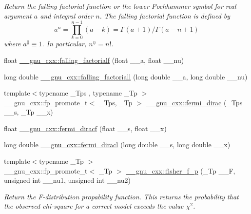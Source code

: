 \begin{DoxyCompactItemize}
\begin{DoxyCompactList}\small\item\em Return the falling factorial function or the lower Pochhammer symbol for real argument $ a $ and integral order $ n $. The falling factorial function is defined by \[ a^{\underline{n}} = \prod_{k=0}^{n-1} (a - k) = \Gamma(a + 1) / \Gamma(a - n + 1) \] where $ a^{\underline{0}} \equiv 1 $. In particular, $ n^{\underline{n}} = n! $. \end{DoxyCompactList}\item 
float \hyperlink{group__gnu__math__spec__func_gaf32abbc790bfa870725728e5470de532}{\+\_\+\+\_\+gnu\+\_\+cxx\+::falling\+\_\+factorialf} (float \+\_\+\+\_\+a, float \+\_\+\+\_\+nu)
\item 
long double \hyperlink{group__gnu__math__spec__func_gab816c3bcbe00595881799ce969475085}{\+\_\+\+\_\+gnu\+\_\+cxx\+::falling\+\_\+factoriall} (long double \+\_\+\+\_\+a, long double \+\_\+\+\_\+nu)
\item 
{\footnotesize template$<$typename \+\_\+\+Tps , typename \+\_\+\+Tp $>$ }\\\+\_\+\+\_\+gnu\+\_\+cxx\+::fp\+\_\+promote\+\_\+t$<$ \+\_\+\+Tps, \+\_\+\+Tp $>$ \hyperlink{group__gnu__math__spec__func_ga5468fbaed5cb8384cff7cfb9d2188d1a}{\+\_\+\+\_\+gnu\+\_\+cxx\+::fermi\+\_\+dirac} (\+\_\+\+Tps \+\_\+\+\_\+s, \+\_\+\+Tp \+\_\+\+\_\+x)
\item 
float \hyperlink{group__gnu__math__spec__func_gacf7f49b2b7bf50fd37d939236712cbe2}{\+\_\+\+\_\+gnu\+\_\+cxx\+::fermi\+\_\+diracf} (float \+\_\+\+\_\+s, float \+\_\+\+\_\+x)
\item 
long double \hyperlink{group__gnu__math__spec__func_ga3876af54a92853036cc88ec6b8ea5d67}{\+\_\+\+\_\+gnu\+\_\+cxx\+::fermi\+\_\+diracl} (long double \+\_\+\+\_\+s, long double \+\_\+\+\_\+x)
\item 
{\footnotesize template$<$typename \+\_\+\+Tp $>$ }\\\+\_\+\+\_\+gnu\+\_\+cxx\+::fp\+\_\+promote\+\_\+t$<$ \+\_\+\+Tp $>$ \hyperlink{group__gnu__math__spec__func_ga1c769cbf42c1abecc6881cfe67dc6d14}{\+\_\+\+\_\+gnu\+\_\+cxx\+::fisher\+\_\+f\+\_\+p} (\+\_\+\+Tp \+\_\+\+\_\+F, unsigned int \+\_\+\+\_\+nu1, unsigned int \+\_\+\+\_\+nu2)
\begin{DoxyCompactList}\small\item\em Return the F-\/distribution propability function. This returns the probability that the observed chi-\/square for a correct model exceeds the value $ \chi^2 $. \end{DoxyCompactList}\item 

\end{DoxyCompactItemize}
